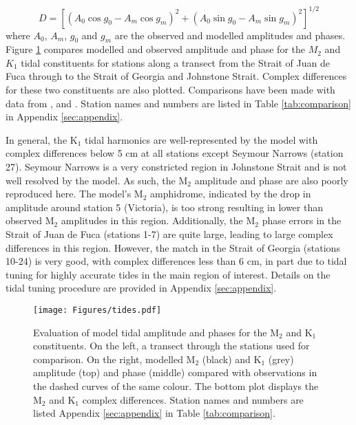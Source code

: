 \documentclass{tATO2e}
\begin{document}
\begin{equation}
D = [(A_0 \cos g_0 - A_m \cos g_m)^2 + (A_0 \sin g_0 - A_m \sin g_m)^2]^{1/2}
\end{equation}\label{eq:compdiff}
where $A_0$, $A_m$, $g_0$ and $g_m$ are the observed and modelled amplitudes and phases. Figure \ref{fig:tides} compares modelled and observed amplitude and phase for the $M_2$ and $K_1$ tidal constituents for stations along a transect from the Strait of Juan de Fuca through to the Strait of Georgia and Johnstone Strait. Complex differences for these two constituents are also plotted.  Comparisons have been made with data from \citet{foreman1995tidal}, \citet{foreman2004m} and \citet{foreman2012circulation}. Station names and numbers are listed in Table  \ref{tab:comparison} in Appendix \ref{sec:appendix}.

In general, the K$_1$ tidal harmonics are well-represented by the model with complex differences below 5 cm at all stations except Seymour Narrows (station 27). Seymour Narrows is a very constricted region in Johnstone Strait and is not well resolved by the model. As such, the M$_2$ amplitude and phase are also poorly reproduced here. The model's M$_2$ amphidrome, indicated by the drop in amplitude around station 5 (Victoria), is too strong resulting in lower than observed M$_2$ amplitudes in this region. Additionally, the M$_2$ phase errors in the Strait of Juan de Fuca (stations 1-7) are quite large, leading to large complex differences in this region.  However, the match in the Strait of Georgia (stations 10-24) is very good, with complex differences less than 6 cm, in part due to tidal tuning for highly accurate tides in the main region of interest. Details on the tidal tuning procedure are provided in Appendix \ref{sec:appendix}.


\begin{figure}
\centering
\texttt{[image: Figures/tides.pdf]}
\caption{Evaluation of model tidal amplitude and phases for the M$_2$ and K$_1$ constituents. On the left, a transect through the stations used for comparison. On the right, modelled M$_2$ (black) and K$_1$ (grey) amplitude (top) and phase (middle) compared with observations in the dashed curves of the same colour. The bottom plot displays the M$_2$ and K$_1$ complex differences. Station names and numbers are listed Appendix \ref{sec:appendix} in Table \ref{tab:comparison}.}
\label{fig:tides}
\end{figure}
\end{document}
